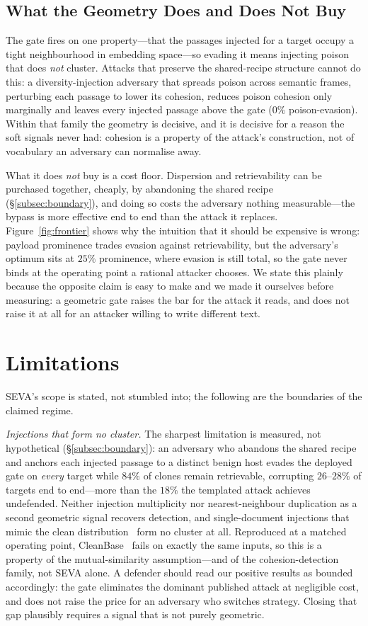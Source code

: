 \documentclass[10pt,journal,compsoc]{IEEEtran}
\begin{document}
\subsection{What the Geometry Does and Does Not Buy}
The gate fires on one property---that the passages injected for a target occupy a tight
neighbourhood in embedding space---so evading it means injecting poison that does \emph{not}
cluster. Attacks that preserve the shared-recipe structure cannot do this: a diversity-injection
adversary that spreads poison across semantic frames, perturbing each passage to lower its
cohesion, reduces poison cohesion only marginally and leaves every injected passage above the
gate ($0\%$ poison-evasion). Within that family the geometry is decisive, and it is decisive for
a reason the soft signals never had: cohesion is a property of the attack's construction, not of
vocabulary an adversary can normalise away.

What it does \emph{not} buy is a cost floor. Dispersion and retrievability can be purchased
together, cheaply, by abandoning the shared recipe (\S\ref{subsec:boundary}), and doing so costs
the adversary nothing measurable---the bypass is more effective end to end than the attack it
replaces. Figure~\ref{fig:frontier} shows why the intuition that it should be expensive is
wrong: payload prominence trades evasion against retrievability, but the adversary's optimum
sits at $25\%$ prominence, where evasion is still total, so the gate never binds at the
operating point a rational attacker chooses. We state this plainly because the opposite claim is
easy to make and we made it ourselves before measuring: a geometric gate raises the bar for the
attack it reads, and does not raise it at all for an attacker willing to write different text.

\section{Limitations}
\label{sec:limits}
SEVA's scope is stated, not stumbled into; the following are the boundaries of the
claimed regime.

\emph{Injections that form no cluster.} The sharpest limitation is measured, not hypothetical
(\S\ref{subsec:boundary}): an adversary who abandons the shared recipe and anchors each injected
passage to a distinct benign host evades the deployed gate on \emph{every} target while $84\%$
of clones remain retrievable, corrupting $26$--$28\%$ of targets end to end---more than the
$18\%$ the templated attack achieves undefended. Neither injection multiplicity nor
nearest-neighbour duplication as a second geometric signal recovers detection, and
single-document injections that mimic the clean distribution~\cite{corruptrag} form no cluster
at all. Reproduced at a matched operating point, CleanBase~\cite{cleanbase} fails on exactly the
same inputs, so this is a property of the mutual-similarity assumption---and of the
cohesion-detection family, not SEVA alone. A defender should read our positive results as
bounded accordingly: the gate eliminates the dominant published attack at negligible cost, and
does not raise the price for an adversary who switches strategy. Closing that gap plausibly
requires a signal that is not purely geometric.
\end{document}
